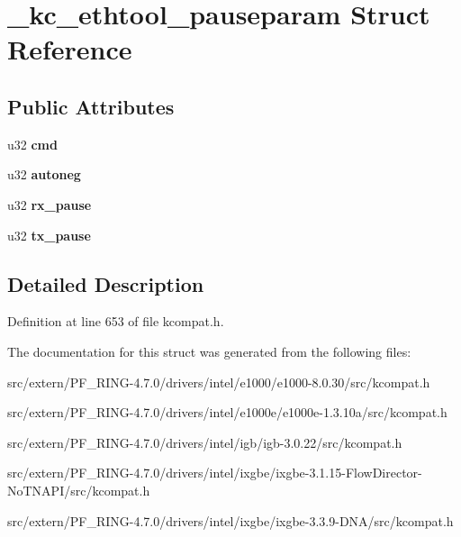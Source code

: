 \hypertarget{struct__kc__ethtool__pauseparam}{
\section{\_\-kc\_\-ethtool\_\-pauseparam Struct Reference}
\label{struct__kc__ethtool__pauseparam}
}
\subsection*{Public Attributes}
\begin{DoxyCompactItemize}
\item 
\hypertarget{struct__kc__ethtool__pauseparam_a23bae965640af7a48efbbc5945b9e72e}{
u32 {\bfseries cmd}}
\label{struct__kc__ethtool__pauseparam_a23bae965640af7a48efbbc5945b9e72e}

\item 
\hypertarget{struct__kc__ethtool__pauseparam_af63019ff9569653f3c3bb6c6f6467b9e}{
u32 {\bfseries autoneg}}
\label{struct__kc__ethtool__pauseparam_af63019ff9569653f3c3bb6c6f6467b9e}

\item 
\hypertarget{struct__kc__ethtool__pauseparam_a791777cda35fff6dbd11d4bf1d694ec8}{
u32 {\bfseries rx\_\-pause}}
\label{struct__kc__ethtool__pauseparam_a791777cda35fff6dbd11d4bf1d694ec8}

\item 
\hypertarget{struct__kc__ethtool__pauseparam_ab7fae46ec22e978a2660b777c1832bd4}{
u32 {\bfseries tx\_\-pause}}
\label{struct__kc__ethtool__pauseparam_ab7fae46ec22e978a2660b777c1832bd4}

\end{DoxyCompactItemize}


\subsection{Detailed Description}


Definition at line 653 of file kcompat.h.



The documentation for this struct was generated from the following files:\begin{DoxyCompactItemize}
\item 
src/extern/PF\_\-RING-\/4.7.0/drivers/intel/e1000/e1000-\/8.0.30/src/kcompat.h\item 
src/extern/PF\_\-RING-\/4.7.0/drivers/intel/e1000e/e1000e-\/1.3.10a/src/kcompat.h\item 
src/extern/PF\_\-RING-\/4.7.0/drivers/intel/igb/igb-\/3.0.22/src/kcompat.h\item 
src/extern/PF\_\-RING-\/4.7.0/drivers/intel/ixgbe/ixgbe-\/3.1.15-\/FlowDirector-\/NoTNAPI/src/kcompat.h\item 
src/extern/PF\_\-RING-\/4.7.0/drivers/intel/ixgbe/ixgbe-\/3.3.9-\/DNA/src/kcompat.h\end{DoxyCompactItemize}
